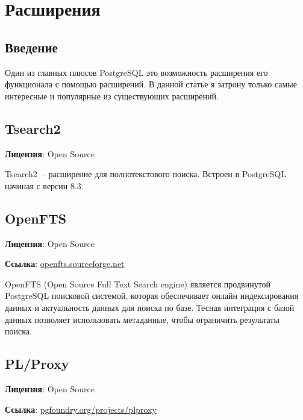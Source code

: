 \chapter{Расширения}

\begin{epigraphs}
\end{epigraphs}

\section{Введение}

Один из главных плюсов PostgreSQL это возможность расширения его функционала с помощью расширений. В данной статье я затрону только самые интересные и популярные из существующих расширений.














\section{Tsearch2}
\textbf{Лицензия}: Open Source

Tsearch2~-- расширение для полнотекстового поиска. Встроен в PostgreSQL начиная с версии 8.3.

\section{OpenFTS}
\textbf{Лицензия}: Open Source

\textbf{Ссылка}: \href{http://openfts.sourceforge.net/}{openfts.sourceforge.net}

OpenFTS (Open Source Full Text Search engine) является продвинутой PostgreSQL поисковой системой, которая обеспечивает онлайн индексирования данных и актуальность данных для поиска по базе. Тесная интеграция с базой данных позволяет использовать метаданные, чтобы ограничить результаты поиска.

\section{PL/Proxy}
\textbf{Лицензия}: Open Source

\textbf{Ссылка}: \href{http://pgfoundry.org/projects/plproxy/}{pgfoundry.org/projects/plproxy}

